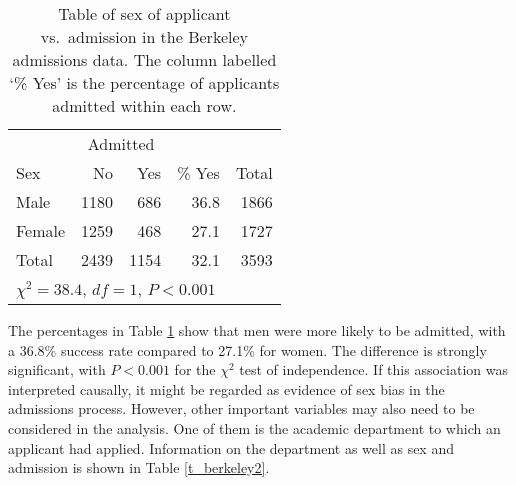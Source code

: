 \begin{table}
\caption{Table of sex of applicant vs.\ admission in the Berkeley
admissions data. The
column labelled `\% Yes' is the percentage of applicants admitted within
each row.}
\label{t_berkeley1}
\begin{center}
\begin{tabular}{|l|rr|r|r|}\hline
& \multicolumn{2}{|c|}{Admitted} & & \\
Sex & No & Yes & \% Yes& Total \\ \hline
Male & 1180 &  686 & 36.8 & 1866 \\
Female & 1259 & 468 & 27.1 & 1727 \\ \hline
Total & 2439 & 1154 & 32.1 & 3593 \\
\hline
\multicolumn{5}{l}{{\small $\chi^{2}=38.4$, $df=1$, $P<0.001$}}
\end{tabular}
\end{center}
\vspace*{-2ex}
\end{table}

The percentages in Table \ref{t_berkeley1} show that men were more
likely to be admitted, with a 36.8\% success rate compared to 27.1\% for
women. The difference is strongly significant, with $P<0.001$ for the
$\chi^{2}$ test of independence. If this association was interpreted
causally, it might be regarded as evidence of sex bias in the admissions
process. However, other important variables may also need to be
considered in the analysis. One of them is the academic department
to which an applicant had applied. Information on the department as well
as sex and admission is shown in Table \ref{t_berkeley2}.

